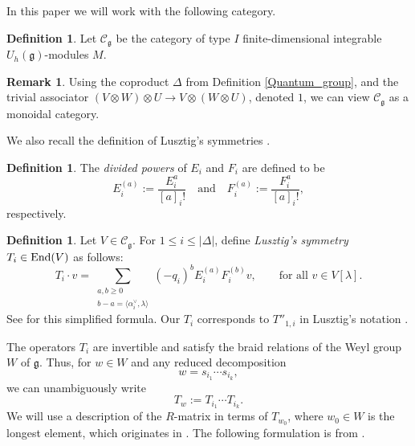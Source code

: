 \documentclass[10pt]{amsart}
\numberwithin{equation}{section}
\theoremstyle{definition}
\newtheorem{remark}[theorem]{Remark}
\newtheorem{definition}[theorem]{Definition}
\newcommand{\End}{{\rm End}}
\newcommand{\g}{\mathfrak{g}}
\begin{document}
In this paper we will work with the following category.

\begin{definition}\label{fd-Uq-mod}
Let $\mathcal{C}_{\mathfrak{g}}$ be the category of type $I$ finite-dimensional integrable $U_h(\mathfrak{g})$-modules $M$.
\end{definition}

\begin{remark}\label{rem:quantumgroupmonoidal}
Using the coproduct $\Delta$ from Definition \ref{Quantum_group}, and the trivial associator $(V\otimes W)\otimes U\rightarrow V\otimes (W\otimes U)$, denoted $1$, we can view $\mathcal{C}_{\g}$ as a monoidal category.
\end{remark}

We also recall the definition of Lusztig's symmetries \cite{Lus4}. 

\begin{definition}
    The \emph{divided powers} of $E_i$ and $F_i$ are defined to be
    \[
    E_i^{(a)}:=\frac{E_i^a}{[a]_i!} \quad \text{and} \quad F_i^{(a)}:=\frac{F_i^a}{[a]_i!},
    \]
    respectively.
\end{definition}

\begin{definition}\label{def:Lussymmetry}
    Let $V\in \mathcal{C}_{\g}$. For $1\le i\le |\Delta|$, define \emph{Lusztig's symmetry} $T_i\in \End(V)$ as follows:
    \begin{equation*}
        T_i\cdot v=\sum_{\substack{a,b\ge 0 \\ b-a=\langle\alpha_i^{\vee},\lambda\rangle}}(-q_i)^bE_i^{(a)}F_i^{(b)}v, \qquad \text{for all $v\in V[\lambda]$}.
    \end{equation*}
See \cite[Remark 2.1]{Cautis} for this simplified formula. Our $T_i$ corresponds to $T''_{1,i}$ in Lusztig's notation \cite{Lus4}. 
\end{definition}

The operators $T_i$ are invertible and satisfy the braid relations of the Weyl group $W$ of $\mathfrak{g}$. Thus, for $w\in W$ and any reduced decomposition
\begin{equation*}
    w=s_{i_1}\cdots s_{i_k},
\end{equation*}
we can unambiguously write
\begin{equation*}
    T_w:=T_{i_1}\cdots T_{i_k}.
\end{equation*}
We will use a description of the $R$-matrix in terms of $T_{w_0}$, where $w_0\in W$ is the longest element, which originates in \cite{KirResh, MR1142216}. The following formulation is from {\cite[Theorem 7.1]{KamnTin}}.
\end{document}
